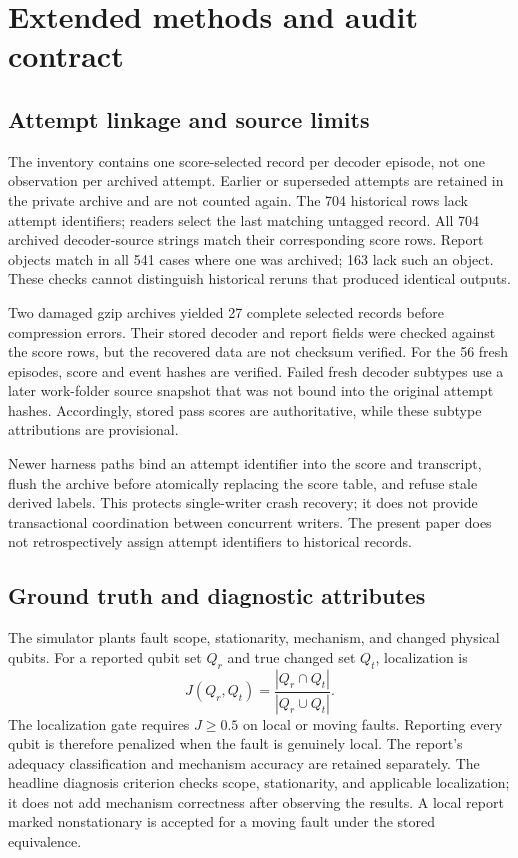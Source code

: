 \section{Extended methods and audit contract}
\subsection{Attempt linkage and source limits}
\label{app:provenance}
The inventory contains one score-selected record per decoder episode, not one observation per archived attempt. Earlier or superseded attempts are retained in the private archive and are not counted again. The 704 historical rows lack attempt identifiers; readers select the last matching untagged record. All 704 archived decoder-source strings match their corresponding score rows. Report objects match in all 541 cases where one was archived; 163 lack such an object. These checks cannot distinguish historical reruns that produced identical outputs.

Two damaged gzip archives yielded 27 complete selected records before compression errors. Their stored decoder and report fields were checked against the score rows, but the recovered data are not checksum verified. For the 56 fresh episodes, score and event hashes are verified. Failed fresh decoder subtypes use a later work-folder source snapshot that was not bound into the original attempt hashes. Accordingly, stored pass scores are authoritative, while these subtype attributions are provisional.

Newer harness paths bind an attempt identifier into the score and transcript, flush the archive before atomically replacing the score table, and refuse stale derived labels. This protects single-writer crash recovery; it does not provide transactional coordination between concurrent writers. The present paper does not retrospectively assign attempt identifiers to historical records.

\subsection{Ground truth and diagnostic attributes}
The simulator plants fault scope, stationarity, mechanism, and changed physical qubits. For a reported qubit set $Q_r$ and true changed set $Q_t$, localization is
\begin{equation}
J(Q_r,Q_t)=\frac{|Q_r\cap Q_t|}{|Q_r\cup Q_t|}.
\end{equation}
The localization gate requires $J\geq0.5$ on local or moving faults. Reporting every qubit is therefore penalized when the fault is genuinely local. The report's adequacy classification and mechanism accuracy are retained separately. The headline diagnosis criterion checks scope, stationarity, and applicable localization; it does not add mechanism correctness after observing the results. A local report marked nonstationary is accepted for a moving fault under the stored equivalence.

